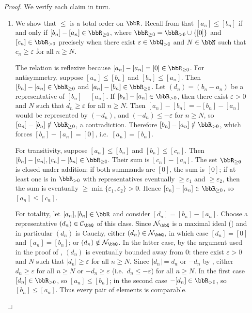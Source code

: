 \begin{proof}
    We verify each claim in turn.

    \begin{enumerate}
        \item We show that $\le$ is a total order on $\bbR$. Recall from  that $[a_n] \le [b_n]$ if and only if $[b_n] - [a_n] \in \bbR_{\ge 0}$, where $\bbR_{\ge 0} = \bbR_{>0} \cup \{[0]\}$ and $[c_n] \in \bbR_{>0}$ precisely when there exist $\varepsilon \in \bbQ_{>0}$ and $N \in \bbN$ such that $c_n \ge \varepsilon$ for all $n \ge N$.

        The relation is reflexive because $[a_n] - [a_n] = [0] \in \bbR_{\ge 0}$. For antisymmetry, suppose $[a_n] \le [b_n]$ and $[b_n] \le [a_n]$. Then $[b_n] - [a_n] \in \bbR_{\ge 0}$ and $[a_n] - [b_n] \in \bbR_{\ge 0}$. Let $(d_n) = (b_n - a_n)$ be a representative of $[b_n] - [a_n]$. If $[b_n] - [a_n] \in \bbR_{>0}$, then there exist $\varepsilon > 0$ and $N$ such that $d_n \ge \varepsilon$ for all $n \ge N$. Then $[a_n] - [b_n] = -[b_n] - [a_n]$ would be represented by $(-d_n)$, and $(-d_n) \le -\varepsilon$ for $n \ge N$, so $[a_n] - [b_n] \notin \bbR_{\ge 0}$, a contradiction. Therefore $[b_n] - [a_n] \notin \bbR_{>0}$, which forces $[b_n] - [a_n] = [0]$, i.e.\ $[a_n] = [b_n]$.

        For transitivity, suppose $[a_n] \le [b_n]$ and $[b_n] \le [c_n]$. Then $[b_n] - [a_n], [c_n] - [b_n] \in \bbR_{\ge 0}$. Their sum is $[c_n] - [a_n]$. The set $\bbR_{\ge 0}$ is closed under addition: if both summands are $[0]$, the sum is $[0]$; if at least one is in $\bbR_{>0}$ with representatives eventually $\ge \varepsilon_1$ and $\ge \varepsilon_2$, then the sum is eventually $\ge \min\{\varepsilon_1, \varepsilon_2\} > 0$. Hence $[c_n] - [a_n] \in \bbR_{\ge 0}$, so $[a_n] \le [c_n]$.

        For totality, let $[a_n], [b_n] \in \bbR$ and consider $[d_n] = [b_n] - [a_n]$. Choose a representative $(d_n) \in \mathcal{C}_\bbQ$ of this class. Since $\mathcal{N}_\bbQ$ is a maximal ideal () and in particular $(d_n)$ is Cauchy, either $(d_n) \in \mathcal{N}_\bbQ$, in which case $[d_n] = [0]$ and $[a_n] = [b_n]$; or $(d_n) \notin \mathcal{N}_\bbQ$. In the latter case, by the argument used in the proof of , $(d_n)$ is eventually bounded away from $0$: there exist $\varepsilon > 0$ and $N$ such that $|d_n| \ge \varepsilon$ for all $n \ge N$. Since $|d_n| = d_n$ or $-d_n$ by , either $d_n \ge \varepsilon$ for all $n \ge N$ or $-d_n \ge \varepsilon$ (i.e.\ $d_n \le -\varepsilon$) for all $n \ge N$. In the first case $[d_n] \in \bbR_{>0}$, so $[a_n] \le [b_n]$; in the second case $-[d_n] \in \bbR_{>0}$, so $[b_n] \le [a_n]$. Thus every pair of elements is comparable.


\end{enumerate}
\end{proof}
